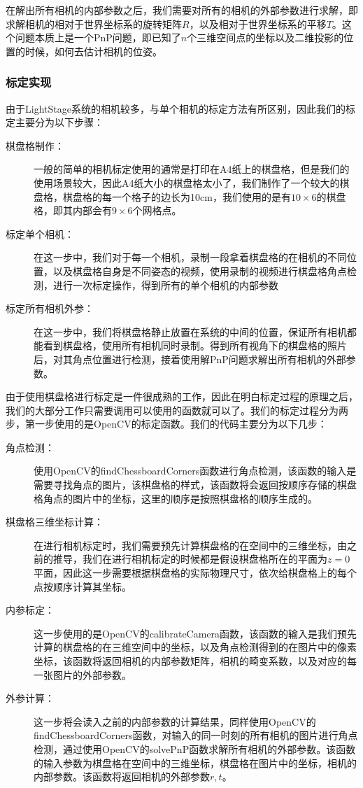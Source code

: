 在解出所有相机的内部参数之后，我们需要对所有的相机的外部参数进行求解，即求解相机的相对于世界坐标系的旋转矩阵\(R\)，以及相对于世界坐标系的平移\(T\)。这个问题本质上是一个PnP问题，即已知了\(n\)个三维空间点的坐标以及二维投影的位置的时候，如何去估计相机的位姿。

\subsubsection{标定实现}
由于LightStage系统的相机较多，与单个相机的标定方法有所区别，因此我们的标定主要分为以下步骤：
\begin{description}
    \item[棋盘格制作：]一般的简单的相机标定使用的通常是打印在A4纸上的棋盘格，但是我们的使用场景较大，因此A4纸大小的棋盘格太小了，我们制作了一个较大的棋盘格，棋盘格的每一个格子的边长为10cm，我们使用的是有\(10\times 6\)的棋盘格，即其内部会有\(9\times 6\)个网格点。
    \item[标定单个相机：]在这一步中，我们对于每一个相机，录制一段拿着棋盘格的在相机的不同位置，以及棋盘格自身是不同姿态的视频，使用录制的视频进行棋盘格角点检测，进行一次标定操作，得到所有的单个相机的内部参数
    \item[标定所有相机外参：]在这一步中，我们将棋盘格静止放置在系统的中间的位置，保证所有相机都能看到棋盘格，使用所有相机同时录制。得到所有视角下的棋盘格的照片后，对其角点位置进行检测，接着使用解PnP问题求解出所有相机的外部参数。
\end{description}

由于使用棋盘格进行标定是一件很成熟的工作，因此在明白标定过程的原理之后，我们的大部分工作只需要调用可以使用的函数就可以了。我们的标定过程分为两步，第一步使用的是OpenCV的标定函数。我们的代码主要分为以下几步：
\begin{description}
    \item[角点检测：]使用OpenCV的\textrm{findChessboardCorners}函数进行角点检测，该函数的输入是需要寻找角点的图片，该棋盘格的样式，该函数将会返回按顺序存储的棋盘格角点的图片中的坐标，这里的顺序是按照棋盘格的顺序生成的。
    \item[棋盘格三维坐标计算：]在进行相机标定时，我们需要预先计算棋盘格的在空间中的三维坐标，由之前的推导，我们在进行相机标定的时候都是假设棋盘格所在的平面为\(z=0\)平面，因此这一步需要根据棋盘格的实际物理尺寸，依次给棋盘格上的每个点按顺序计算其坐标。
    \item[内参标定：]这一步使用的是OpenCV的\textrm{calibrateCamera}函数，该函数的输入是我们预先计算的棋盘格的在三维空间中的坐标，以及角点检测得到的在图片中的像素坐标，该函数将返回相机的内部参数矩阵，相机的畸变系数，以及对应的每一张图片的外部参数。
    \item[外参计算：]这一步将会读入之前的内部参数的计算结果，同样使用OpenCV的\textrm{findChessboardCorners}函数，对输入的同一时刻的所有相机的图片进行角点检测，通过使用OpenCV的\textrm{solvePnP}函数求解所有相机的外部参数。该函数的输入参数为棋盘格在空间中的三维坐标，棋盘格在图片中的坐标，相机的内部参数。该函数将返回相机的外部参数\(r, t\)。
\end{description}

